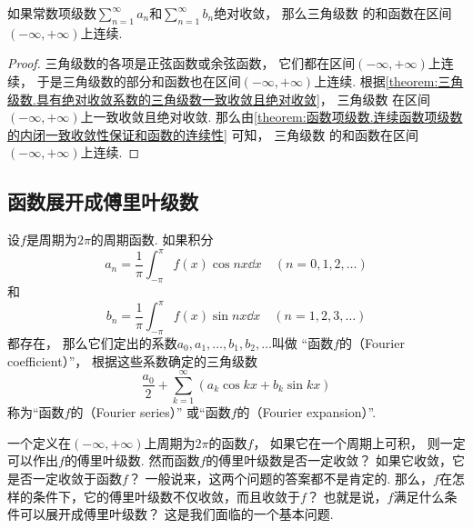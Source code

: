 \begin{property}
如果常数项级数\(\sum_{n=1}^\infty a_n\)和\(\sum_{n=1}^\infty b_n\)绝对收敛，
那么三角级数  的和函数在区间\((-\infty,+\infty)\)上连续.
\begin{proof}
三角级数的各项是正弦函数或余弦函数，
它们都在区间\((-\infty,+\infty)\)上连续，
于是三角级数的部分和函数也在区间\((-\infty,+\infty)\)上连续.
根据\cref{theorem:三角级数.具有绝对收敛系数的三角级数一致收敛且绝对收敛}，
三角级数  在区间\((-\infty,+\infty)\)上一致收敛且绝对收敛.
那么由\cref{theorem:函数项级数.连续函数项级数的内闭一致收敛性保证和函数的连续性} 可知，
三角级数  的和函数在区间\((-\infty,+\infty)\)上连续.
\end{proof}
\end{property}

\subsection{函数展开成傅里叶级数}
\begin{definition}\label{definition:无穷级数.傅里叶级数}
设\(f\)是周期为\(2 \pi\)的周期函数.
如果积分\begin{equation*}
	a_n = \frac{1}{\pi} \int_{-\pi}^\pi f(x) \cos nx \dd{x} \quad(n=0,1,2,\dotsc)
\end{equation*}和\begin{equation*}
	b_n = \frac{1}{\pi} \int_{-\pi}^\pi f(x) \sin nx \dd{x} \quad(n=1,2,3,\dotsc)
\end{equation*}都存在，
那么它们定出的系数\(a_0,a_1,\dotsc,b_1,b_2,\dotsc\)叫做%
“函数\(f\)的（Fourier coefficient）”，
根据这些系数确定的三角级数\begin{equation*}
	\frac{a_0}{2} + \sum_{k=1}^\infty (a_k \cos{kx} + b_k \sin kx)
\end{equation*}称为“函数\(f\)的（Fourier series）”
或“函数\(f\)的（Fourier expansion）”.
\end{definition}

一个定义在\((-\infty,+\infty)\)上周期为\(2\pi\)的函数\(f\)，
如果它在一个周期上可积，
则一定可以作出\(f\)的傅里叶级数.
然而函数\(f\)的傅里叶级数是否一定收敛？
如果它收敛，它是否一定收敛于函数\(f\)？
一般说来，这两个问题的答案都不是肯定的.
那么，\(f\)在怎样的条件下，它的傅里叶级数不仅收敛，而且收敛于\(f\)？
也就是说，\(f\)满足什么条件可以展开成傅里叶级数？
这是我们面临的一个基本问题.

